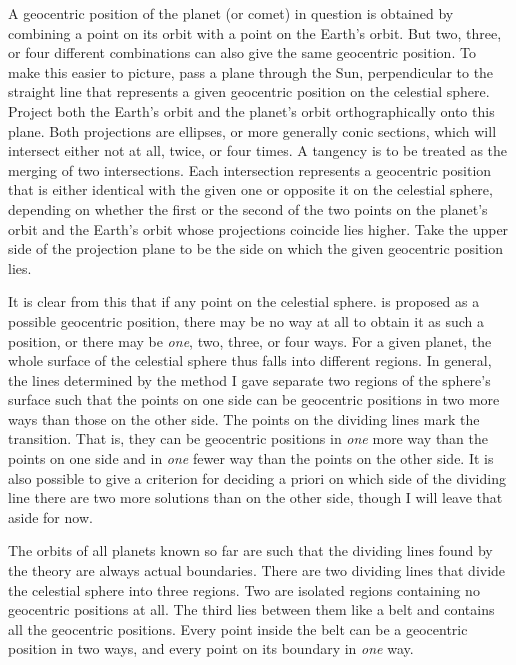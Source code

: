 A geocentric position of the planet (or comet) in question is obtained by combining a point on its orbit with a point on the Earth’s orbit. But two, three, or four different combinations can also give the same geocentric position. To make this easier to picture, pass a plane through the Sun, perpendicular to the straight line that represents a given geocentric position on the celestial sphere. Project both the Earth’s orbit and the planet’s orbit orthographically onto this plane. Both projections are ellipses, or more generally conic sections, which will intersect either not at all, twice, or four times. A tangency is to be treated as the merging of two intersections. Each intersection represents a geocentric position that is either identical with the given one or opposite it on the celestial sphere, depending on whether the first or the second of the two points on the planet’s orbit and the Earth’s orbit whose projections coincide lies higher. Take the upper side of the projection plane to be the side on which the given geocentric position lies.

It is clear from this that if any point on the celestial sphere. is proposed as a possible geocentric position, there may be no way at all to obtain it as such a position, or there may be \textit{one}, two, three, or four ways. For a given planet, the whole surface of the celestial sphere thus falls into different regions. In general, the lines determined by the method I gave separate two regions of the sphere’s surface such that the points on one side can be geocentric positions in two more ways than those on the other side. The points on the dividing lines mark the transition. That is, they can be geocentric positions in \textit{one} more way than the points on one side and in \textit{one} fewer way than the
%
points on the other side. It is also possible to give a criterion for deciding a priori on which side of the dividing line there are two more solutions than on the other side, though I will leave that aside for now.

The orbits of all planets known so far are such that the dividing lines found by the theory are always actual boundaries. There are two dividing lines that divide the celestial sphere into three regions. Two are isolated regions containing no geocentric positions at all. The third lies between them like a belt and contains all the geocentric positions. Every point inside the belt can be a geocentric position in two ways, and every point on its boundary in \textit{one} way.

